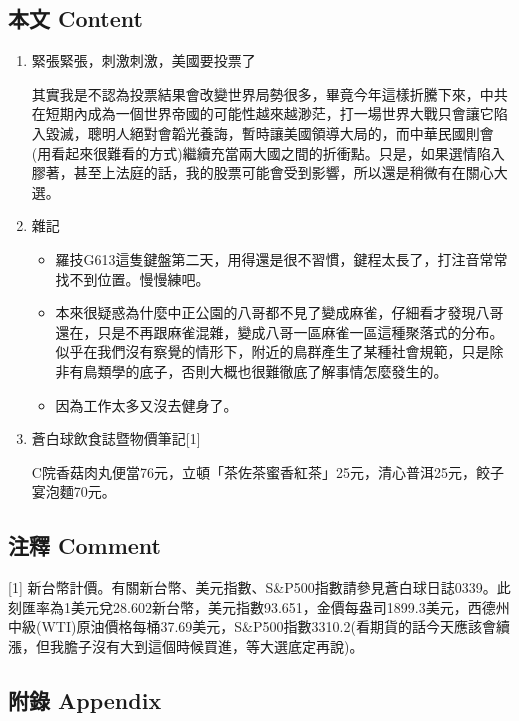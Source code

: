 \documentclass[
]{article}
\providecommand{\tightlist}{%
  \setlength{\itemsep}{0pt}\setlength{\parskip}{0pt}}
\begin{document}
\hypertarget{ux672cux6587-content-60}{%
\subsection{本文 Content}\label{ux672cux6587-content-60}}

\begin{enumerate}
\def\labelenumi{\arabic{enumi}.}
\item
  緊張緊張，刺激刺激，美國要投票了

  其實我是不認為投票結果會改變世界局勢很多，畢竟今年這樣折騰下來，中共在短期內成為一個世界帝國的可能性越來越渺茫，打一場世界大戰只會讓它陷入毀滅，聰明人絕對會韜光養誨，暫時讓美國領導大局的，而中華民國則會(用看起來很難看的方式)繼續充當兩大國之間的折衝點。只是，如果選情陷入膠著，甚至上法庭的話，我的股票可能會受到影響，所以還是稍微有在關心大選。
\item
  雜記

  \begin{itemize}
  \tightlist
  \item
    羅技G613這隻鍵盤第二天，用得還是很不習慣，鍵程太長了，打注音常常找不到位置。慢慢練吧。
  \item
    本來很疑惑為什麼中正公園的八哥都不見了變成麻雀，仔細看才發現八哥還在，只是不再跟麻雀混雜，變成八哥一區麻雀一區這種聚落式的分布。似乎在我們沒有察覺的情形下，附近的鳥群產生了某種社會規範，只是除非有鳥類學的底子，否則大概也很難徹底了解事情怎麼發生的。
  \item
    因為工作太多又沒去健身了。
  \end{itemize}
\item
  蒼白球飲食誌暨物價筆記{[}1{]}

  C院香菇肉丸便當76元，立頓「茶佐茶蜜香紅茶」25元，清心普洱25元，餃子宴泡麵70元。
\end{enumerate}

\hypertarget{ux6ce8ux91cb-comment-60}{%
\subsection{注釋 Comment}\label{ux6ce8ux91cb-comment-60}}

{[}1{]}
新台幣計價。有關新台幣、美元指數、S\&P500指數請參見蒼白球日誌0339。此刻匯率為1美元兌28.602新台幣，美元指數93.651，金價每盎司1899.3美元，西德州中級(WTI)原油價格每桶37.69美元，S\&P500指數3310.2(看期貨的話今天應該會續漲，但我膽子沒有大到這個時候買進，等大選底定再說)。

\hypertarget{ux9644ux9304-appendix-60}{%
\subsection{附錄 Appendix}\label{ux9644ux9304-appendix-60}}
\end{document}
